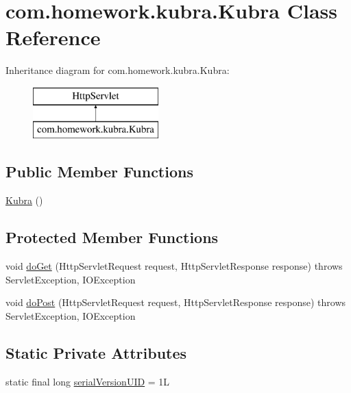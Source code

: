 \hypertarget{classcom_1_1homework_1_1kubra_1_1_kubra}{}\section{com.\+homework.\+kubra.\+Kubra Class Reference}
\label{classcom_1_1homework_1_1kubra_1_1_kubra}
Inheritance diagram for com.\+homework.\+kubra.\+Kubra\+:\begin{figure}[H]
\begin{center}
\leavevmode
\includegraphics[height=2.000000cm]{classcom_1_1homework_1_1kubra_1_1_kubra}
\end{center}
\end{figure}
\subsection*{Public Member Functions}
\begin{DoxyCompactItemize}
\item 
\hyperlink{classcom_1_1homework_1_1kubra_1_1_kubra_a426ba02e54e1b29f0faad26c3445c4f5}{Kubra} ()
\end{DoxyCompactItemize}
\subsection*{Protected Member Functions}
\begin{DoxyCompactItemize}
\item 
void \hyperlink{classcom_1_1homework_1_1kubra_1_1_kubra_ac848be3c477ee3497de96a7da7143537}{do\+Get} (Http\+Servlet\+Request request, Http\+Servlet\+Response response)  throws Servlet\+Exception, I\+O\+Exception 
\item 
void \hyperlink{classcom_1_1homework_1_1kubra_1_1_kubra_afd56ba9fb4938291be08d5f9e242abf0}{do\+Post} (Http\+Servlet\+Request request, Http\+Servlet\+Response response)  throws Servlet\+Exception, I\+O\+Exception 
\end{DoxyCompactItemize}
\subsection*{Static Private Attributes}
\begin{DoxyCompactItemize}
\item 
static final long \hyperlink{classcom_1_1homework_1_1kubra_1_1_kubra_a2eb40523c9e5223c53add8d16cc9ac0e}{serial\+Version\+U\+ID} = 1L
\end{DoxyCompactItemize}


